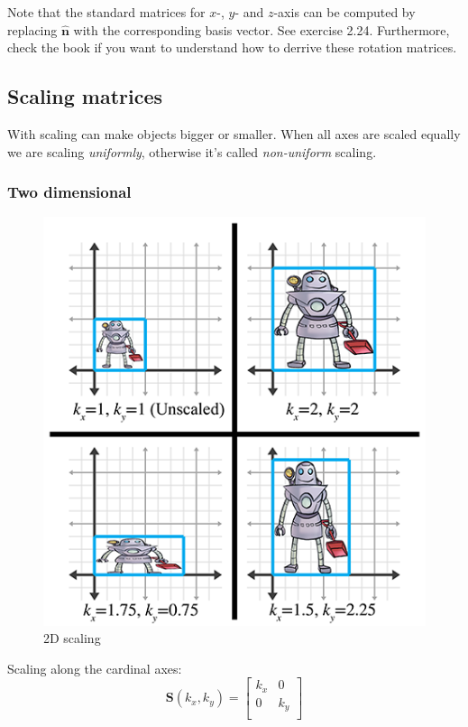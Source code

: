 \documentclass[a4paper,11pt]{article}
\begin{document}
Note that the standard matrices for $x$-, $y$- and $z$-axis can be computed by replacing $\hat{\textbf{n}}$ with the corresponding basis vector. See exercise 2.24. Furthermore, check the book if you want to understand how to derrive these rotation matrices.

\subsection{Scaling matrices}

With scaling can make objects bigger or smaller. When all axes are scaled equally we are scaling \textit{uniformly}, otherwise it's called \textit{non-uniform} scaling.

\subsubsection{Two dimensional}

\begin{figure}[H]
\centering
    \includegraphics{05_scaling}
\caption{2D scaling}
\label{fig:2d-scaling}
\end{figure}

Scaling along the cardinal axes: \\
$$
\mathbf{S}(k_{x},k_{y}) =
\begin{bmatrix}
k_{x} & 0 \\
0 & k_{y} \\
\end{bmatrix}
$$
\end{document}

